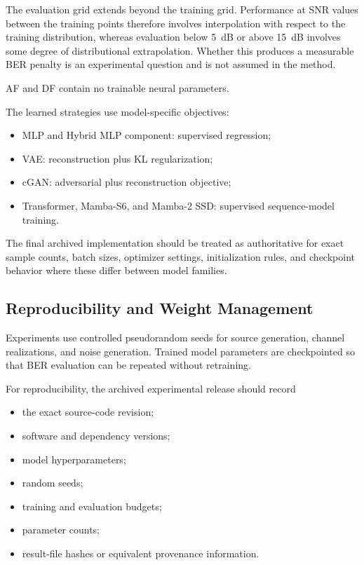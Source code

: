The evaluation grid extends beyond the training grid. Performance at
SNR values between the training points therefore involves
interpolation with respect to the training distribution, whereas
evaluation below 5~dB or above 15~dB involves some degree of
distributional extrapolation. Whether this produces a measurable BER
penalty is an experimental question and is not assumed in the method.

AF and DF contain no trainable neural parameters.

The learned strategies use model-specific objectives:

\begin{itemize}
    \item MLP and Hybrid MLP component: supervised regression;
    \item VAE: reconstruction plus KL regularization;
    \item cGAN: adversarial plus reconstruction objective;
    \item Transformer, Mamba-S6, and Mamba-2 SSD:
          supervised sequence-model training.
\end{itemize}

The final archived implementation should be treated as authoritative
for exact sample counts, batch sizes, optimizer settings, initialization
rules, and checkpoint behavior where these differ between model
families.


\subsection{Reproducibility and Weight Management}
\label{sec:reproducibility-and-weight-management}

Experiments use controlled pseudorandom seeds for source generation,
channel realizations, and noise generation. Trained model parameters
are checkpointed so that BER evaluation can be repeated without
retraining.

For reproducibility, the archived experimental release should record

\begin{itemize}
    \item the exact source-code revision;
    \item software and dependency versions;
    \item model hyperparameters;
    \item random seeds;
    \item training and evaluation budgets;
    \item parameter counts;
    \item result-file hashes or equivalent provenance information.
\end{itemize}

